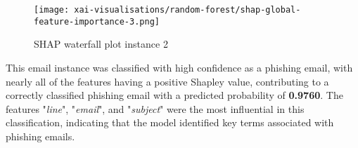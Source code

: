 \begin{figure}[H]
  \begin{center}
    \texttt{[image: xai-visualisations/random-forest/shap-global-feature-importance-3.png]}
    \caption{SHAP waterfall plot instance 2}
  \end{center}
\end{figure}

\noindent This email instance was classified with high confidence as a phishing email, with nearly all of the features having a positive Shapley value, contributing to a correctly classified phishing email with a predicted probability of \textbf{0.9760}. The features "\textit{line}", "\textit{email}", and "\textit{subject}" were the most influential in this classification, indicating that the model identified key terms associated with phishing emails.\newline
